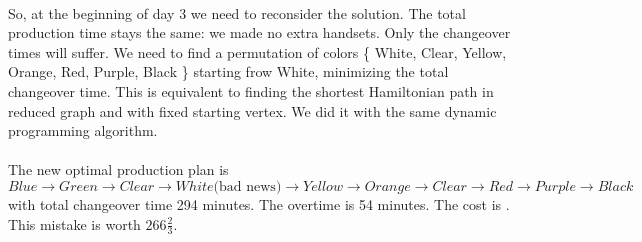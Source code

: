 \paragraph{}
So, at the beginning of day 3 we need to reconsider the solution. The total production time stays the same: we made no extra handsets. Only the changeover times will suffer. We need to find a permutation of colors \{ White, Clear, Yellow, Orange, Red, Purple, Black \} starting frow White, minimizing the total changeover time. This is equivalent to finding the shortest Hamiltonian path in reduced graph and with fixed starting vertex. We did it with the same dynamic programming algorithm.

\paragraph{}
The new optimal production plan is $ Blue \rightarrow Green \rightarrow Clear \rightarrow White \text{(bad news)} \rightarrow Yellow \rightarrow Orange \rightarrow Clear \rightarrow Red \rightarrow Purple \rightarrow Black $ with total changeover time 294 minutes. The overtime is 54 minutes. The cost is . This mistake is worth \texteuro $266\frac{2}{3}$.
